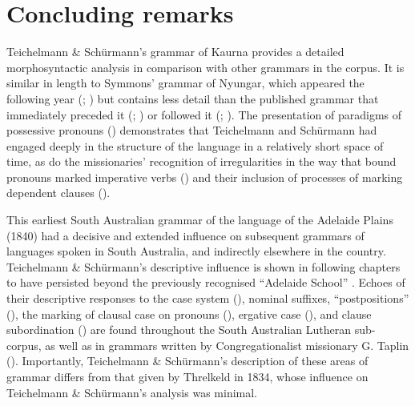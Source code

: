 \section{Concluding remarks}
\label{sec:key:5.7}

Teichelmann \& Schürmann’s grammar of Kaurna provides a detailed morphosyntactic analysis in comparison with other grammars in the corpus. It is similar in length to Symmons' grammar of Nyungar, which appeared the following year (\citeyear{symmons_grammatical_1841}; ) but contains less detail than the published grammar that immediately preceded it (\citealt{threlkeld_australian_1834}; ) or followed it (\citealt{meyer_vocabulary_1843}; ). The presentation of paradigms of possessive pronouns () demonstrates that Teichelmann and Schürmann had engaged deeply in the structure of the language in a relatively short space of time, as do the missionaries' recognition of irregularities in the way that bound pronouns marked imperative verbs () and their inclusion of processes of marking dependent clauses ().

This earliest South Australian grammar of the language of the Adelaide Plains (1840) had a decisive and extended influence on subsequent grammars of languages spoken in South Australia, and indirectly elsewhere in the country. Teichelmann \& Schürmann’s descriptive influence is shown in following chapters to have persisted beyond the previously recognised “Adelaide School” \citep[410]{simpson_notes_1992}. Echoes of their descriptive responses to the case system (), nominal suffixes, “postpositions” (), the marking of clausal case on pronouns (), ergative case (), and clause subordination () are found throughout the South Australian Lutheran sub-corpus, as well as in grammars written by Congregationalist missionary G. Taplin (). Importantly, Teichelmann \& Schürmann’s description of these areas of grammar differs from that given by Threlkeld in 1834, whose influence on Teichelmann \& Schürmann’s analysis was minimal.
